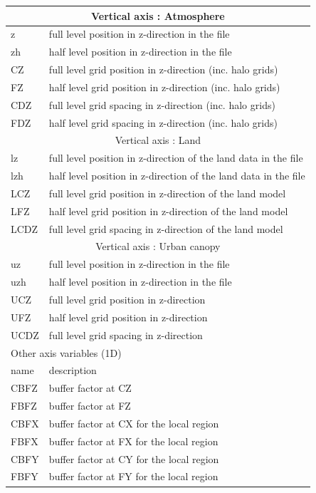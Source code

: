 \begin{longtable}{l|l}
\multicolumn{2}{c}{Vertical axis : Atmosphere}\\ \hline
z   & full level position in z-direction in the file \\
zh  & half level position in z-direction in the file \\
CZ  & full level grid position in z-direction (inc. halo grids) \\
FZ  & half level grid position in z-direction (inc. halo grids) \\
CDZ & full level grid spacing  in z-direction (inc. halo grids) \\
FDZ & half level grid spacing  in z-direction (inc. halo grids) \\ \hline
\multicolumn{2}{c}{Vertical axis : Land}\\ \hline
lz   & full level position in z-direction of the land data in the file \\
lzh  & half level position in z-direction of the land data in the file \\
LCZ  & full level grid position in z-direction of the land model \\
LFZ  & half level grid position in z-direction of the land model \\
LCDZ & full level grid spacing in z-direction of the land model \\  \hline
\multicolumn{2}{c}{Vertical axis : Urban canopy}\\ \hline
uz   & full level position in z-direction in the file \\
uzh  & half level position in z-direction in the file \\
UCZ  & full level grid position in z-direction \\
UFZ  & half level grid position in z-direction \\
UCDZ & full level grid spacing in z-direction \\ \hline
 \hline
  \multicolumn{2}{l}{Other axis variables (1D)}\\ \hline
name  & description \\ \hline \hline
CBFZ  & buffer factor at CZ \\
FBFZ  & buffer factor at FZ \\
CBFX  & buffer factor at CX for the local region \\
FBFX  & buffer factor at FX for the local region \\
CBFY  & buffer factor at CY for the local region \\
FBFY  & buffer factor at FY for the local region \\

\end{longtable}

